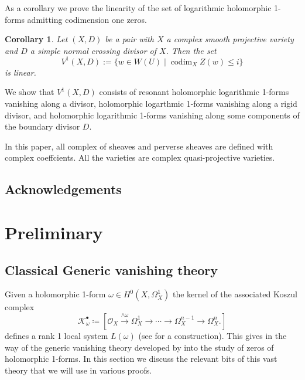 \documentclass[11pt,reqno]{amsart}
\newtheorem{corollary}[theorem]{Corollary}
\theoremstyle{definition}
\newtheorem{definition}[theorem]{Definition}
\theoremstyle{remark}
\theoremstyle{cited}
\theoremstyle{citeddef}
\DeclareMathOperator{\codim}{codim}              %
\newcommand{\sK}{\mathcal{K}}
\newcommand{\sO}{\mathcal{O}}
\newcommand{\sZ}{\mathcal{Z}}
\begin{document}
As a corollary we prove the linearity of the set of logarithmic holomorphic 1-forms admitting codimension one zeros.

\begin{corollary}
Let $(X, D)$ be a pair with $X$ a complex smooth projective variety and $D$ a simple normal crossing divisor of $X$. Then the set $$ V^1(X,D):=\{ w \in W(U) \mid \codim_X Z(w) \leq i \}$$ is linear.
\end{corollary}

We show that $V^1(X,D)$ consists of resonant holomorphic logarithmic 1-forms vanishing along a divisor, holomorphic logarthmic 1-forms vanishing along a rigid divisor, and holomorphic logarithmic 1-forms vanishing along some components of the boundary divisor $D$.


In this paper, all complex of sheaves and perverse sheaves are defined with complex
coeffcients. All the varieties are complex quasi-projective varieties. 

\subsection*{Acknowledgements}



\section{Preliminary}
\subsection{Classical Generic vanishing theory}
Given a holomorphic 1-form $\omega\in H^0(X,\Omega_X^1)$
the kernel of the associated Koszul complex
\begin{equation}
\sK^{\bullet}_{\omega} \coloneqq [\sO_X\overset{\wedge\omega}{\to} \Omega_X^1 \to \cdots\to \Omega_X^{n-1}\to \Omega^n_X.]
\label{eq:koszul}
\end{equation}
defines a rank 1 local system $L(\omega)$ (see \cite[\S 2.1]{sch}
for a construction). This gives in the way of the generic vanishing theory developed by \cite{GL, Ara, Sim} into the 
study of zeros of holomorphic 1-forms. In this section we discuss 
the relevant bits of this vast theory that we will use in various
proofs.
%
%
\end{document}

